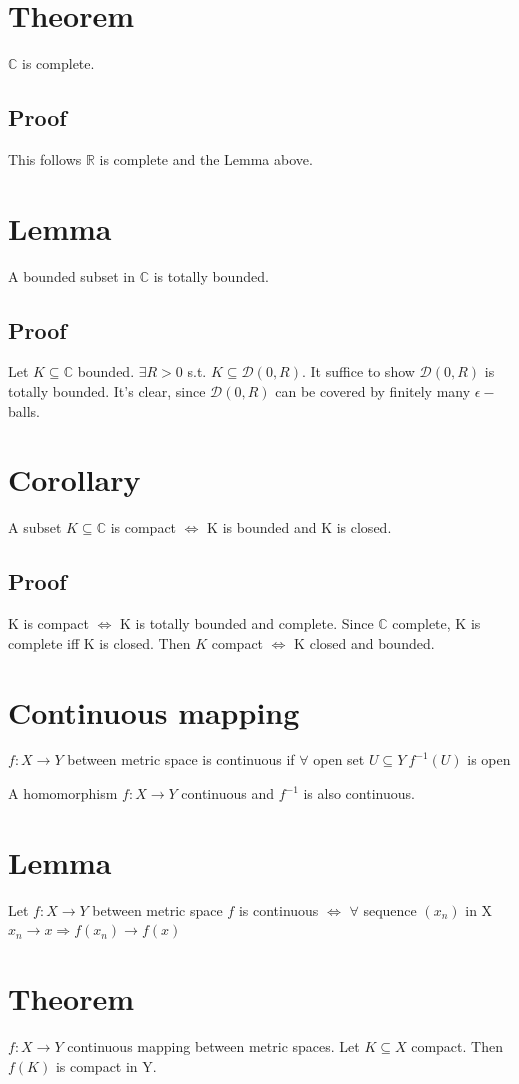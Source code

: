 \documentclass{book}
\begin{document}
\section{Theorem} $\mathbb C$ is complete.
\subsection*{Proof}This follows $\mathbb R$ is complete and the Lemma above.
\section{Lemma} A bounded subset in $\mathbb C$ is totally bounded.
\subsection*{Proof}
Let $K\subseteq\mathbb C$ bounded. $\exists R>0$ s.t. $K\subseteq \mathcal{D}(0,R)$. It suffice to show $\mathcal D(0,R)$ is totally bounded. It's clear, since $\mathcal{D}(0,R)$ can be covered by finitely many $\epsilon-$balls.
\section{Corollary}
A subset $K\subseteq \mathbb C$ is compact $\Leftrightarrow$ K is bounded and K is closed. 
\subsection*{Proof}K is compact $\Leftrightarrow$ K is totally bounded and complete. Since $\mathbb C$ complete, K is complete iff K is closed. Then $K$ compact $\Leftrightarrow$  K closed and bounded.
\section{Continuous mapping}
$f:X\rightarrow Y$ between metric space is continuous if $\forall$ open set $U\subseteq Y\ f^{-1}(U)$ is open

A homomorphism $f:X\rightarrow Y$ continuous and $f^{-1}$ is also continuous.
\section{Lemma}
Let $f:X\rightarrow Y$ between metric space $f$ is continuous $\Leftrightarrow$ $\forall$ sequence $(x_n)$ in X $x_n\rightarrow x\Rightarrow f(x_n)\rightarrow f(x)$
\section{Theorem}
$f:X\rightarrow Y$ continuous mapping between metric spaces. Let $K\subseteq X$ compact. Then $f(K)$ is compact in Y.
\end{document}
